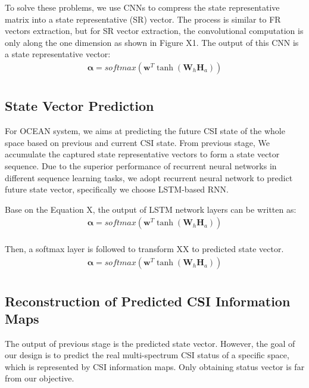 \documentclass[10pt,conference,letterpaper]{IEEEtran}
\begin{document}
To solve these problems, we use CNNs to compress the state representative matrix into a state representative (SR) vector. The process is similar to FR vectors extraction, but for SR vector extraction, the convolutional computation is only along the one dimension as shown in Figure X1. The output of this CNN is a state representative vector:
\begin{eqnarray}
\mathbf{\alpha}  = softmax \left( {{\mathbf{w}^T}\tanh({\mathbf{W}_h}\mathbf{H}_a)} \right)\label{eq:9}\\
\end{eqnarray}

\subsection{State Vector Prediction}

For OCEAN system, we aims at predicting the future CSI state of the whole space based on previous and current CSI state. From previous stage, We accumulate the captured state representative vectors to form a state vector sequence. Due to the superior performance of recurrent neural networks in different sequence learning tasks, we adopt recurrent neural network to predict future state vector, specifically we choose LSTM-based RNN.

Base on the Equation X, the output of LSTM network layers can be written as:
\begin{eqnarray}
\mathbf{\alpha}  = softmax \left( {{\mathbf{w}^T}\tanh({\mathbf{W}_h}\mathbf{H}_a)} \right)\label{eq:9}\\
\end{eqnarray}

Then, a softmax layer is followed to transform XX to predicted state vector.
\begin{eqnarray}
\mathbf{\alpha}  = softmax \left( {{\mathbf{w}^T}\tanh({\mathbf{W}_h}\mathbf{H}_a)} \right)\label{eq:9}\\
\end{eqnarray}

\subsection{Reconstruction of Predicted CSI Information Maps}
The output of previous stage is the predicted state vector. However, the goal of our design is to predict the real multi-spectrum CSI status of a specific space, which is represented by CSI information maps. Only obtaining status vector is far from our objective.
\end{document}
